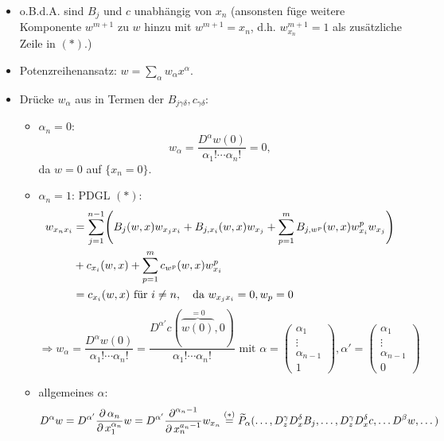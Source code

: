 \begin{enumerate}[(1)]
\begin{itemize}
			\item o.B.d.A. sind $B_j$ und $c$ unabhängig von $x_n$ (ansonsten füge weitere Komponente $w^{m+1}$ zu $w$ hinzu mit $w^{m+1} = x_n$, d.h. $w_{x_n}^{m+1} = 1$ als zusätzliche Zeile in $(*)$.)
			\item Potenzreihenansatz: $w = \sum\limits_{\alpha} w_\alpha x^\alpha$.
			\item Drücke $w_\alpha$ aus in Termen der $B_{j\gamma\delta}, c_{\gamma\delta}$:
				\begin{itemize}
					\item $\alpha_n = 0$:
					\[ w_\alpha = \frac{D^\alpha w(0)}{\alpha_1! \cdots \alpha_n!} = 0, \]
					da $w = 0$ auf $\{x_n = 0\}$.
					\item $\alpha_n = 1$: PDGL $(*)$:
					\begin{equation}
					\begin{aligned}
						w_{x_nx_i} &= \sum\limits_{j=1}^{n-1} \enbrace*{B_j(w,x) w_{x_jx_i} + B_{j,x_i}(w,x) w_{x_j} + \sum\limits_{p=1}^{m} B_{j,w^p} (w,x) w_{x_i}^p w_{x_j}} \\
						&+ c_{x_i}(w,x) + \sum\limits_{p=1}^{m} c_{w^p} (w,x) w_{x_i}^p \\ \notag
						&= c_{x_i} (w,x) \text{ für } i \neq n, \quad \text{da } w_{x_jx_i} = 0, w_p = 0
					\end{aligned}
					\end{equation}
					\[ \Rightarrow w_\alpha = \frac{D^\alpha w(0)}{\alpha_1! \cdots \alpha_n!} = \frac{D^{\alpha'} c(\overbrace{w(0)}^{=0},0)}{\alpha_1! \cdots \alpha_n!} \text{ mit } \alpha = \begin{pmatrix} \alpha_1 \\ \vdots \\ \alpha_{n-1} \\ 1 \end{pmatrix}, \alpha' = \begin{pmatrix} \alpha_1 \\ \vdots \\ \alpha_{n-1} \\ 0 \end{pmatrix} \]
					\item allgemeines $\alpha$:
					\begin{equation}
					\begin{aligned}
						D^\alpha w = D^{\alpha'} \frac{\der \alpha_n}{\der x_1^{\alpha_n}} w = D^{\alpha'} \frac{\der^{\alpha_n-1}}{\der x_n^{a_n -1}} w_{x_n} &\overset{(*)}{=} \widetilde{P}_\alpha (\dots,D_z^\gamma D_x^\delta B_j,\dots,D_z^\gamma D_x^\delta c,\dots D^\beta w,\dots) \\ \notag

\end{aligned}
\end{equation}
\end{itemize}
\end{itemize}
\end{enumerate}
